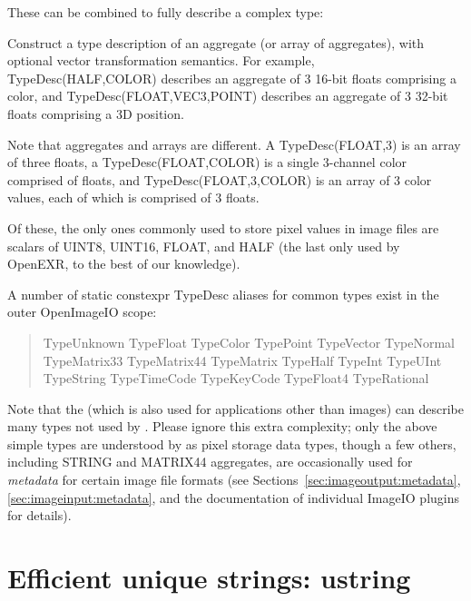 \noindent These can be combined to fully describe a complex type:

Construct a type description of an aggregate (or array of aggregates),
with optional vector transformation semantics.  For example, 
{\cf TypeDesc(HALF,COLOR)} describes an aggregate of 3 16-bit floats
comprising a color, and {\cf TypeDesc(FLOAT,VEC3,POINT)} describes 
an aggregate of 3 32-bit floats comprising a 3D position.

Note that aggregates and arrays are different.  A {\cf
  TypeDesc(FLOAT,3)} is an array of three floats, a {\cf
  TypeDesc(FLOAT,COLOR)} is a single 3-channel color comprised of
floats, and {\cf TypeDesc(FLOAT,3,COLOR)} is an array of 3 color values,
each of which is comprised of 3 floats.
\apiend

\bigskip

Of these, the only ones commonly used to store pixel values in image files
are scalars of {\cf UINT8}, {\cf UINT16}, {\cf FLOAT}, and {\cf HALF}
(the last only used by OpenEXR, to the best of our knowledge).

A number of {\cf static constexpr TypeDesc} aliases for common types exist
in the outer {\cf OpenImageIO} scope:

\begin{quote}
{\cf
TypeUnknown
TypeFloat
TypeColor
TypePoint
TypeVector
TypeNormal \\
TypeMatrix33
TypeMatrix44
TypeMatrix
TypeHalf
TypeInt
TypeUInt \\
TypeString
TypeTimeCode
TypeKeyCode
TypeFloat4
TypeRational
}
\end{quote}

Note that the \TypeDesc (which is also used for applications other
than images) can describe many types not used by
\product.  Please ignore this extra complexity; only the above simple types are understood by
\product as pixel storage data types, though a few others, including
{\cf STRING} and {\cf MATRIX44} aggregates, are occasionally used for
\emph{metadata} for certain image file formats (see
Sections~\ref{sec:imageoutput:metadata}, \ref{sec:imageinput:metadata},
and the documentation of individual ImageIO plugins for details).


\section{Efficient unique strings: {\cf ustring}}
\label{sec:ustring}

